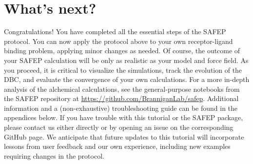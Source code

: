 \documentclass[9pt,tutorial]{Styling/livecoms}
\begin{document}
\section{What's next?}

Congratulations! You have completed all the essential steps of the SAFEP protocol. You can now apply the protocol above to your own receptor-ligand binding problem, applying minor changes as needed. Of course, the outcome of your SAFEP calculation will be only as realistic as your model and force field.
As you proceed, it is critical to visualize the simulations, track the evolution of the DBC, and evaluate the convergence of your own calculations.
For a more in-depth analysis of the alchemical calculations, see the general-purpose notebooks from the SAFEP repository at \url{https://github.com/BranniganLab/safep}. 
Additional information and a (non-exhaustive) troubleshooting guide can be found in the appendices below.
If you have trouble with this tutorial or the SAFEP package, please contact us either directly or by opening an issue on the corresponding GitHub page.
We anticipate that future updates to this tutorial will incorporate lessons from user feedback and our own experience, including new examples requiring changes in the protocol.
\end{document}
